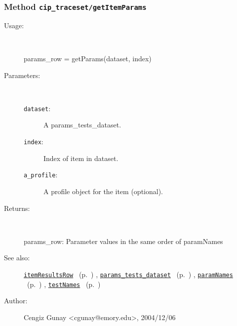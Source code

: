 \subsubsection[Method \texttt{getItemParams}]{Method \texttt{cip\_traceset/getItemParams}}%
%
\label{ref_cip_traceset__getItemParams}%
\hypertarget{ref_cip_traceset__getItemParams}{}%
\begin{description}
%
\item[Usage:]~%
\begin{lyxcode}%
params\_row = getParams(dataset, index)
%
\end{lyxcode}%
%
%
\item[Parameters:]~
\begin{description}%
\item[\texttt{dataset}:]
 A params\_tests\_dataset.
\item[\texttt{index}:]
 Index of item in dataset.
\item[\texttt{a\_profile}:]
 A profile object for the item (optional).
\end{description}%
%
\item[Returns:]~

	params\_row: Parameter values in the same order of paramNames
%
%
\item[See also:]%
\hyperlink{ref_itemResultsRow}{\texttt{itemResultsRow}}%
\ (p.~\pageref{ref_itemResultsRow})%
%
, \hyperlink{ref_params_tests_dataset}{\texttt{params\_tests\_dataset}}%
\ (p.~\pageref{ref_params_tests_dataset})%
%
, \hyperlink{ref_paramNames}{\texttt{paramNames}}%
\ (p.~\pageref{ref_paramNames})%
%
, \hyperlink{ref_testNames}{\texttt{testNames}}%
\ (p.~\pageref{ref_testNames})%
%
%
\item[Author:]%
Cengiz Gunay <cgunay@emory.edu>, 2004/12/06%
\end{description}
\methodline%
